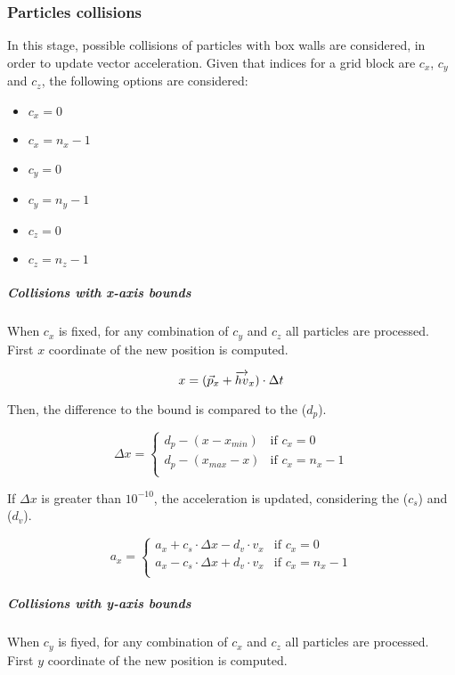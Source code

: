 \subsubsection{Particles collisions}

In this stage, possible collisions of particles with box walls are considered,
in order to update vector acceleration. 
Given that indices for a grid block are $c_x$, $c_y$ and $c_z$, the following
options are considered:

\begin{itemize}
\item $c_x=0$
\item $c_x=n_x-1$
\item $c_y=0$
\item $c_y=n_y-1$
\item $c_z=0$
\item $c_z=n_z-1$
\end{itemize}

\subparagraph{Collisions with x-axis bounds}

When $c_x$ is fixed, for any combination of $c_y$ and $c_z$ all particles are
processed. First $x$ coordinate of the new position is computed.

\[
x = (\vec{p}_x + \overrightarrow{hv}_x) \cdot \Delta t \\
\]

Then, the difference to the bound is compared to the  ($d_p$).

\[
\Delta x = 
\begin{cases}
d_p - (x - x_{min}) & \text{if } c_x = 0\\
d_p - (x_{max} - x) & \text{if } c_x = n_x -1\\
\end{cases}
\]

If $\Delta x$ is greater than $10^{-10}$, the acceleration is updated,
considering the  ($c_s$) and 
($d_v$).

\[
a_x = 
\begin{cases}
  a_x + c_s \cdot \Delta x - d_v \cdot v_x & \text{if  } c_x = 0\\
  a_x - c_s \cdot \Delta x + d_v \cdot v_x & \text{if  } c_x = n_x-1\\
\end{cases}
\]

\subparagraph{Collisions with y-axis bounds}

When $c_y$ is fiyed, for any combination of $c_x$ and $c_z$ all particles are
processed. First $y$ coordinate of the new position is computed.

